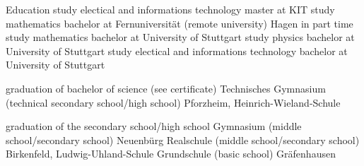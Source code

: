 \versionLanguageStart%
\begin{rubric}{\textcolor{black!20!blue!100}{Education}}%
	\entry*[10/2024 --- 07/2025]
		study electical and informations technology master at KIT
	\entry*[04/2018 --- 2019]
		study mathematics bachelor at Fernuniversität (remote university) Hagen in part time
	\entry*[10/2014 --- 03/2018]
		study mathematics bachelor at University of Stuttgart
	\entry*[10/2013 --- 09/2016]
		study physics bachelor at University of Stuttgart
	\entry*[10/2012 --- 08/2016]
		study electical and informations technology bachelor at University of Stuttgart
		
		graduation of bachelor of science (see certificate)
	\entry*[09/2009 --- 06/2012]
		Technisches Gymnasium (technical secondary school/high school) Pforzheim, Heinrich-Wieland-Schule
		
		graduation of the secondary school/high school
	\entry*[09/2005 --- 07/2009]
		Gymnasium (middle school/secondary school) Neuenbürg
	\entry*[09/2004 --- 07/2005]
		Realschule (middle school/secondary school) Birkenfeld, Ludwig-Uhland-Schule
	\entry*[09/2000 --- 07/2004]
		Grundschule (basic school) Gräfenhausen
\end{rubric}
\versionLanguageEnd